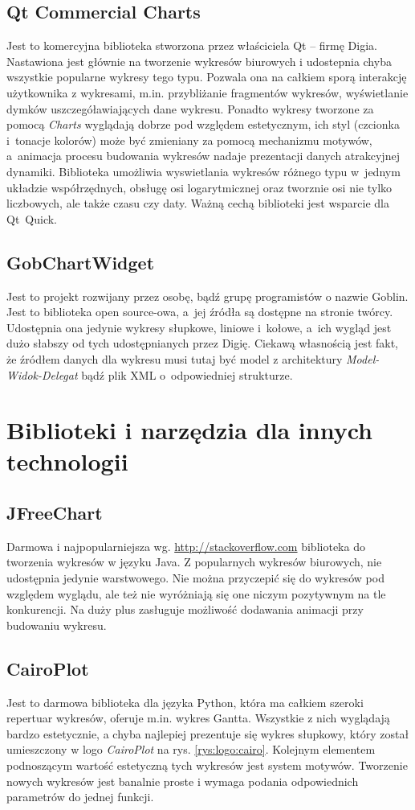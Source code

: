 \documentclass[11pt,twoside,a4paper,final]{llncs}
\begin{document}
\subsection{Qt Commercial Charts}
Jest to komercyjna biblioteka stworzona przez właściciela Qt -- firmę Digia. Nastawiona jest głównie na tworzenie wykresów biurowych i udostepnia chyba wszystkie popularne wykresy tego typu. Pozwala ona na całkiem sporą interakcję użytkownika z wykresami, m.in. przybliżanie fragmentów wykresów, wyświetlanie dymków uszczegóławiających dane wykresu. Ponadto wykresy tworzone za pomocą \textit{Charts} wyglądają dobrze pod względem estetycznym, ich styl (czcionka i~tonacje kolorów) może być zmieniany za pomocą mechanizmu motywów, a~animacja procesu budowania wykresów nadaje prezentacji danych atrakcyjnej dynamiki. Biblioteka umożliwia wyswietlania wykresów różnego typu w~jednym układzie współrzędnych, obsługę osi logarytmicznej oraz tworznie osi nie tylko liczbowych, ale także czasu czy daty. Ważną cechą biblioteki jest wsparcie dla Qt~Quick.

\subsection{GobChartWidget}
Jest to projekt rozwijany przez osobę, bądź grupę programistów o nazwie Goblin. Jest to biblioteka open source-owa, a~jej źródła są dostępne na stronie twórcy. Udostępnia ona jedynie wykresy słupkowe, liniowe i~kołowe, a~ich wygląd jest dużo słabszy od tych udostępnianych przez Digię. Ciekawą własnością jest fakt, że źródłem danych dla wykresu musi tutaj być model z architektury \textit{Model-Widok-Delegat} bądź plik XML o~odpowiedniej strukturze.


\section{Biblioteki i narzędzia dla innych technologii}
\subsection{JFreeChart}
Darmowa i najpopularniejsza wg. \url{http://stackoverflow.com} biblioteka do tworzenia wykresów w języku Java. Z popularnych wykresów biurowych, nie udostępnia jedynie warstwowego. Nie można przyczepić się do wykresów pod względem wyglądu, ale też nie wyróżniają się one niczym pozytywnym na tle konkurencji. Na duży plus zasługuje możliwość dodawania animacji przy budowaniu wykresu.

\subsection{CairoPlot}
Jest to darmowa biblioteka dla języka Python, która ma całkiem szeroki repertuar wykresów, oferuje m.in. wykres Gantta. Wszystkie z nich wyglądają bardzo estetycznie, a chyba najlepiej prezentuje się wykres słupkowy, który został umieszczony w logo \textit{CairoPlot} na rys. \ref{rys:logo:cairo}. Kolejnym elementem podnoszącym wartość estetyczną tych wykresów jest system motywów. Tworzenie nowych wykresów jest banalnie proste i wymaga podania odpowiednich parametrów do jednej funkcji.
\end{document}
